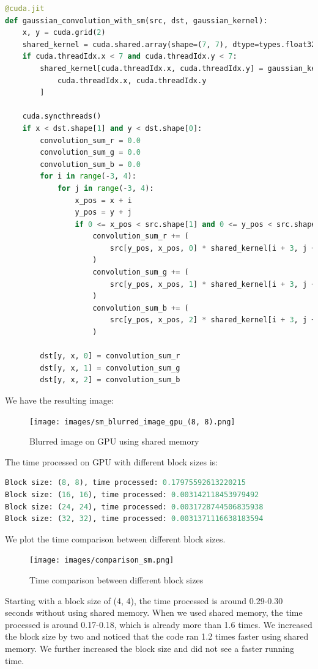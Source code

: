 \documentclass[12pt]{article}
\begin{document}
\begin{lstlisting}[language=Python]
@cuda.jit
def gaussian_convolution_with_sm(src, dst, gaussian_kernel):
    x, y = cuda.grid(2)
    shared_kernel = cuda.shared.array(shape=(7, 7), dtype=types.float32)
    if cuda.threadIdx.x < 7 and cuda.threadIdx.y < 7:
        shared_kernel[cuda.threadIdx.x, cuda.threadIdx.y] = gaussian_kernel[
            cuda.threadIdx.x, cuda.threadIdx.y
        ]

    cuda.syncthreads()
    if x < dst.shape[1] and y < dst.shape[0]:
        convolution_sum_r = 0.0
        convolution_sum_g = 0.0
        convolution_sum_b = 0.0
        for i in range(-3, 4):
            for j in range(-3, 4):
                x_pos = x + i
                y_pos = y + j
                if 0 <= x_pos < src.shape[1] and 0 <= y_pos < src.shape[0]:
                    convolution_sum_r += (
                        src[y_pos, x_pos, 0] * shared_kernel[i + 3, j + 3]
                    )
                    convolution_sum_g += (
                        src[y_pos, x_pos, 1] * shared_kernel[i + 3, j + 3]
                    )
                    convolution_sum_b += (
                        src[y_pos, x_pos, 2] * shared_kernel[i + 3, j + 3]
                    )

        dst[y, x, 0] = convolution_sum_r
        dst[y, x, 1] = convolution_sum_g
        dst[y, x, 2] = convolution_sum_b
\end{lstlisting}

\noindent
We have the resulting image:
\begin{figure}[H]
\centering
    \texttt{[image: images/sm\_blurred\_image\_gpu\_(8, 8).png]}
    \caption{Blurred image on GPU using shared memory}
\end{figure}

\noindent
The time processed on GPU with different block sizes is:

\begin{lstlisting}[language=Python]
Block size: (8, 8), time processed: 0.17975592613220215
Block size: (16, 16), time processed: 0.003142118453979492
Block size: (24, 24), time processed: 0.0031728744506835938
Block size: (32, 32), time processed: 0.0031371116638183594
\end{lstlisting}

\noindent
We plot the time comparison between different block sizes. 

\begin{figure}[H]
\centering
    \texttt{[image: images/comparison\_sm.png]}
    \caption{Time comparison between different block sizes}
\end{figure}


\noindent
Starting with a block size of (4, 4), the time processed is around 0.29-0.30 seconds without using shared memory. When we used shared memory, the time processed is around 0.17-0.18, which is already more than 1.6 times. We increased the block size by two and noticed that the code ran 1.2 times faster using shared memory. We further increased the block size and did not see a faster running time. 
\end{document}
